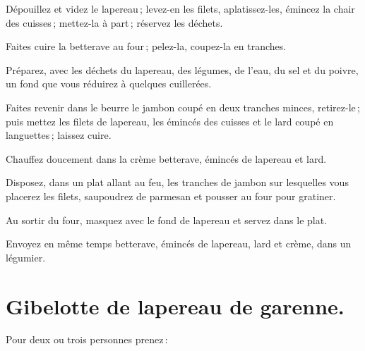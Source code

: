 Dépouillez et videz le lapereau ; levez-en les filets, aplatissez-les, émincez
la chair des cuisses ; mettez-la à part ; réservez les déchets.

Faites cuire la betterave au four ; pelez-la, coupez-la en tranches.

Préparez, avec les déchets du lapereau, des légumes, de l'eau, du sel et du
poivre, un fond que vous réduirez à quelques cuillerées.

Faites revenir dans le beurre le jambon coupé en deux tranches minces,
retirez-le ; puis mettez les filets de lapereau, les émincés des cuisses et le
lard coupé en languettes ; laissez cuire.

Chauffez doucement dans la crème betterave, émincés de lapereau et lard.

Disposez, dans un plat allant au feu, les tranches de jambon sur lesquelles
vous placerez les filets, saupoudrez de parmesan et pousser au four pour
gratiner.

Au sortir du four, masquez avec le fond de lapereau et servez dans le plat.

Envoyez en même temps betterave, émincés de lapereau, lard et crème, dans un
légumier.

\section*{\centering Gibelotte de lapereau de garenne.}
{}
\label{pg0648} \hypertarget{p0648}{}

Pour deux ou trois personnes prenez :

